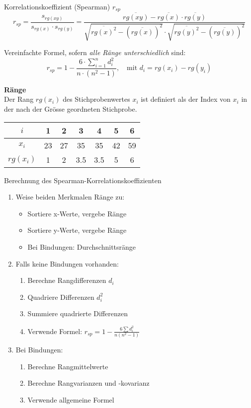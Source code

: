 \begin{definition}{Korrelationskoeffizient (Spearman) $r_{sp}$}
$$r_{sp} = \frac{s_{rg(xy)}}{s_{rg(x)} \cdot s_{rg(y)}} = \frac{\overline{rg(xy)} - \overline{rg(x)} \cdot \overline{rg(y)}}{\sqrt{\overline{rg(x)^2} - (\overline{rg(x)})^2} \cdot \sqrt{\overline{rg(y)^2} - (\overline{rg(y)})^2}}$$

Vereinfachte Formel, sofern \emph{alle Ränge unterschiedlich} sind:
$$r_{sp} = 1 - \frac{6 \cdot \sum_{i=1}^n d_i^2}{n \cdot (n^2 - 1)}, \quad \text{mit } d_i = rg(x_i) - rg(y_i)$$

\textbf{Ränge}\\
Der Rang $rg(x_i)$ des Stichprobenwertes $x_i$ ist definiert als der Index von $x_i$ in der nach der Grösse geordneten Stichprobe.

\begin{center}
\begin{tabular}{|c|c|c|c|c|c|c|}
\hline
$i$ & 1 & 2 & 3 & 4 & 5 & 6 \\
\hline
$x_i$ & 23 & 27 & 35 & 35 & 42 & 59 \\
\hline
$rg(x_i)$ & 1 & 2 & 3.5 & 3.5 & 5 & 6 \\
\hline
\end{tabular}
\end{center}
\end{definition}

\begin{KR}{Berechnung des Spearman-Korrelationskoeffizienten}
\begin{enumerate}
    \item Weise beiden Merkmalen Ränge zu:
        \begin{itemize}
            \item Sortiere x-Werte, vergebe Ränge
            \item Sortiere y-Werte, vergebe Ränge
            \item Bei Bindungen: Durchschnittsränge
        \end{itemize}
    \item Falls keine Bindungen vorhanden:
        \begin{enumerate}
            \item Berechne Rangdifferenzen $d_i$
            \item Quadriere Differenzen $d_i^2$
            \item Summiere quadrierte Differenzen
            \item Verwende Formel: $r_{sp} = 1 - \frac{6 \sum d_i^2}{n(n^2-1)}$
        \end{enumerate}
    \item Bei Bindungen:
        \begin{enumerate}
            \item Berechne Rangmittelwerte
            \item Berechne Rangvarianzen und -kovarianz
            \item Verwende allgemeine Formel
        \end{enumerate}
\end{enumerate}
\end{KR}

